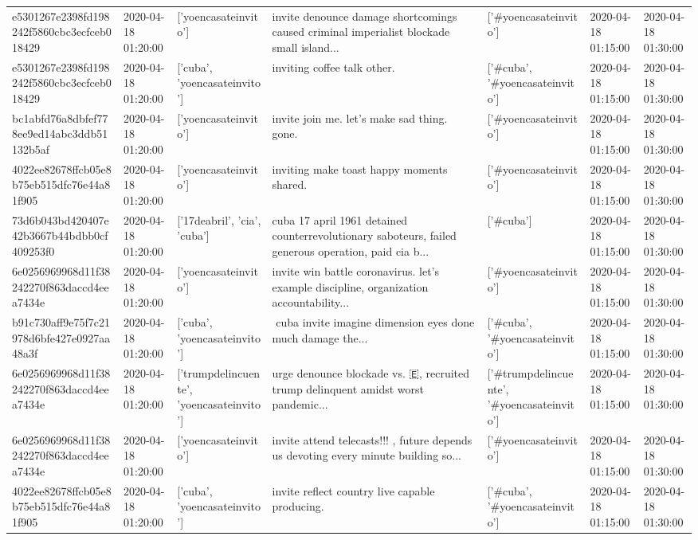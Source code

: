 \begin{tabular}{lllllll}
e5301267e2398fd198242f5860cbc3ecfceb018429 & 2020-04-18 01:20:00 & ['yoencasateinvito'] & invite denounce damage shortcomings caused criminal imperialist blockade small island... & ['#yoencasateinvito'] & 2020-04-18 01:15:00 & 2020-04-18 01:30:00 \\
e5301267e2398fd198242f5860cbc3ecfceb018429 & 2020-04-18 01:20:00 & ['cuba', 'yoencasateinvito'] & inviting coffee talk other. & ['#cuba', '#yoencasateinvito'] & 2020-04-18 01:15:00 & 2020-04-18 01:30:00 \\
bc1abfd76a8dbfef778ee9ed14abc3ddb51132b5af & 2020-04-18 01:20:00 & ['yoencasateinvito'] & invite join me. let's make sad thing. gone. & ['#yoencasateinvito'] & 2020-04-18 01:15:00 & 2020-04-18 01:30:00 \\
4022ee82678ffcb05e8b75eb515dfc76e44a81f905 & 2020-04-18 01:20:00 & ['yoencasateinvito'] & inviting make toast happy moments shared. & ['#yoencasateinvito'] & 2020-04-18 01:15:00 & 2020-04-18 01:30:00 \\
73d6b043bd420407e42b3667b44bdbb0cf409253f0 & 2020-04-18 01:20:00 & ['17deabril', 'cia', 'cuba'] & cuba 17 april 1961 detained counterrevolutionary saboteurs, failed generous operation, paid cia b... & ['#cuba'] & 2020-04-18 01:15:00 & 2020-04-18 01:30:00 \\
6e0256969968d11f38242270f863daccd4eea7434e & 2020-04-18 01:20:00 & ['yoencasateinvito'] & invite win battle coronavirus. let's example discipline, organization accountability... & ['#yoencasateinvito'] & 2020-04-18 01:15:00 & 2020-04-18 01:30:00 \\
b91c730aff9e75f7c21978d6bfe427e0927aa48a3f & 2020-04-18 01:20:00 & ['cuba', 'yoencasateinvito'] & ️ cuba invite imagine dimension eyes done much damage the... & ['#cuba', '#yoencasateinvito'] & 2020-04-18 01:15:00 & 2020-04-18 01:30:00 \\
6e0256969968d11f38242270f863daccd4eea7434e & 2020-04-18 01:20:00 & ['trumpdelincuente', 'yoencasateinvito'] & urge denounce blockade vs. 🇪, recruited trump delinquent amidst worst pandemic... & ['#trumpdelincuente', '#yoencasateinvito'] & 2020-04-18 01:15:00 & 2020-04-18 01:30:00 \\
6e0256969968d11f38242270f863daccd4eea7434e & 2020-04-18 01:20:00 & ['yoencasateinvito'] & invite attend telecasts!!! , future depends us devoting every minute building so... & ['#yoencasateinvito'] & 2020-04-18 01:15:00 & 2020-04-18 01:30:00 \\
4022ee82678ffcb05e8b75eb515dfc76e44a81f905 & 2020-04-18 01:20:00 & ['cuba', 'yoencasateinvito'] & invite reflect country live capable producing. & ['#cuba', '#yoencasateinvito'] & 2020-04-18 01:15:00 & 2020-04-18 01:30:00 \\

\end{tabular}
